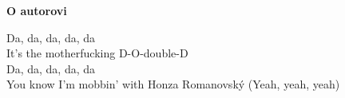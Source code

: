 
\clearpage
{}
{}
\begin{adjustwidth}{0.1\textwidth}{0.1\textwidth}
\begingroup
\null\vspace{0.2\textheight}
\begin{center}
{\bfseries\Large O autorovi}\par\vspace{2em}

Da, da, da, da, da \\
It's the motherfucking D-O-double-D \\
Da, da, da, da, da \\
You know I'm mobbin' with Honza Romanovský (Yeah, yeah, yeah)
\end{center}
\endgroup
\end{adjustwidth}
\clearpage
